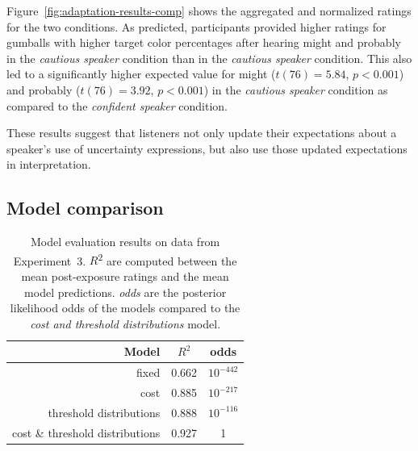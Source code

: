 \documentclass[man, floatsintext]{apa6}
\begin{document}
Figure~\ref{fig:adaptation-results-comp} shows the aggregated and normalized ratings for the two conditions.  As predicted, participants provided higher ratings for gumballs with higher target color percentages after hearing {\sc might} and {\sc probably} in the \emph{cautious speaker} condition than in the \emph{cautious speaker} condition. This also led to a significantly higher expected value for {\sc might} ($t(76)=5.84$, $p<0.001$) and {\sc probably} ($t(76)=3.92$, $p<0.001$) in the \emph{cautious speaker} condition as compared to the \emph{confident speaker} condition.

These results suggest that listeners not only update their expectations about a speaker's use of uncertainty expressions, but also use those updated expectations in interpretation.

\subsection{Model comparison}

\begin{table}
\center
\begin{tabular}{r | c | c }
Model & $R^2$ &   odds  \\ \midrule
fixed & 0.662 & $10^{-442}$    \\
cost & 0.885 &  $10^{-217}$  \\
threshold distributions & 0.888 & $10^{-116}$  \\
cost \& threshold distributions & 0.927 & 1 \\
\end{tabular}
\caption{Model evaluation results on data from Experiment~3.  $R$\textsuperscript{$2$} are computed between  the mean post-exposure ratings and the mean model predictions. \textit{odds} are the posterior likelihood odds of the models compared to the \textit{cost and threshold distributions} model.  \label{tbl:model-comparison-comp}}
\end{table}
\end{document}
